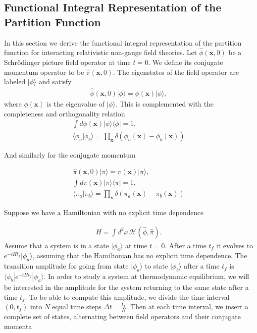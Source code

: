         \subsection{Functional Integral Representation of the Partition Function}
        In this section we derive the functional integral representation of the partition function for interacting relativistic non-gauge field theories.
        Let $\hat{\phi}(\bm{x},0)$ be a Schr{\H o}dinger picture field operator at time $t=0$. We define its conjugate momentum operator to be $\hat{\pi}(\bm{x},0)$. The eigenstates of the field operator are labeled $| \phi \rangle$ and satisfy
        \begin{align}
            \hat{\phi}(\bm{x},0) | \phi \rangle = \phi(\bm{x}) | \phi \rangle,
        \end{align}
        where $\phi(\bm{x})$ is the eigenvalue of $| \phi \rangle$. This is complemented with the completeness and orthogonality relation
        \begin{align}
            \int d \phi(\bm{x}) | \phi \rangle \langle \phi | = 1, \\
            \langle \phi_a | \phi_b \rangle = \prod_{\bm{x}} \delta(\phi_a(\bm{x}) - \phi_b(\bm{x}))
        \end{align}

        And similarly for the conjugate momentum

        \begin{align}
            \hat{\pi}(\bm{x},0) | \pi \rangle = \pi(\bm{x}) | \pi \rangle, \\
            \int d \pi(\bm{x}) | \pi \rangle \langle \pi | = 1, \\
            \langle \pi_a | \pi_b \rangle = \prod_{\bm{x}} \delta(\pi_a(\bm{x}) - \pi_b(\bm{x}))
        \end{align}

        Suppose we have a Hamiltonian with no explicit time dependence


        \begin{align}
            H = \int d^2x \, \mathcal{H}(\hat{\phi}, \hat{\pi}).
        \end{align}
        Assume that a system is in a state $| \phi_a \rangle$ at time $t=0$. After a time $t_f$ it evolves to $e^{-i H t_f} | \phi_a \rangle$, assuming that the Hamiltonian has no explicit time dependence. The transition amplitude for going from state $| \phi_a \rangle$ to state $| \phi_b \rangle$ after a time $t_f$ is $\langle \phi_b | e^{-i H t_f} | \phi_a \rangle$. In order to study a system at thermodynamic equilibrium, we will be interested in the amplitude for the system returning to the same state after a time $t_f$. To be able to compute this amplitude, we divide the time interval $(0, t_f)$ into $N$ equal time steps $\Delta t = \frac{t_f}{N}$. Then at each time interval, we insert a complete set of states, alternating between field operators and their conjugate momenta


